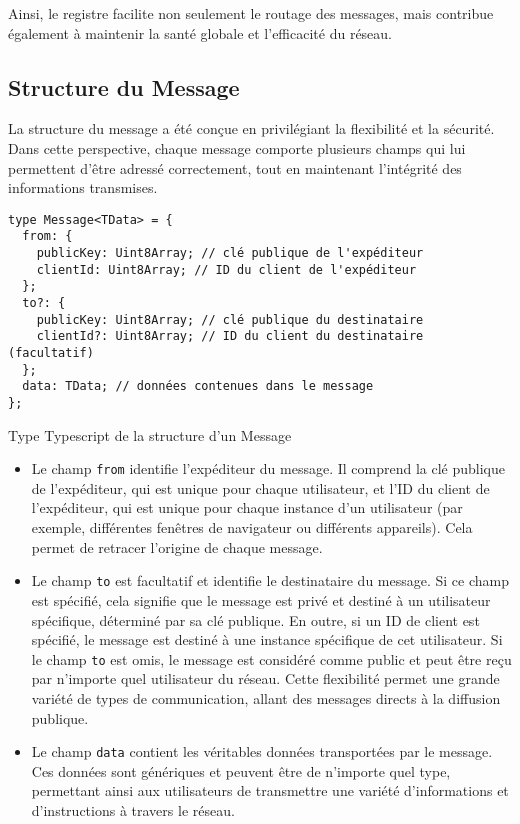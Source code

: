 Ainsi, le registre facilite non seulement le routage des messages, mais contribue également à maintenir la santé globale et l'efficacité du réseau.

\subsection{Structure du Message}

La structure du message a été conçue en privilégiant la flexibilité et la sécurité. Dans cette perspective, chaque message comporte plusieurs champs qui lui permettent d'être adressé correctement, tout en maintenant l'intégrité des informations transmises.

\begin{listing}[H]
    \begin{verbatim}
type Message<TData> = {
  from: {
    publicKey: Uint8Array; // clé publique de l'expéditeur
    clientId: Uint8Array; // ID du client de l'expéditeur
  };
  to?: {
    publicKey: Uint8Array; // clé publique du destinataire
    clientId?: Uint8Array; // ID du client du destinataire (facultatif)
  };
  data: TData; // données contenues dans le message
};
\end{verbatim}
    \caption{Type Typescript de la structure d'un Message}
\end{listing}

\begin{itemize}
    \item Le champ \texttt{from} identifie l'expéditeur du message. Il comprend la clé publique de l'expéditeur, qui est unique pour chaque utilisateur, et l'ID du client de l'expéditeur, qui est unique pour chaque instance d'un utilisateur (par exemple, différentes fenêtres de navigateur ou différents appareils). Cela permet de retracer l'origine de chaque message.
    \item Le champ \texttt{to} est facultatif et identifie le destinataire du message. Si ce champ est spécifié, cela signifie que le message est privé et destiné à un utilisateur spécifique, déterminé par sa clé publique. En outre, si un ID de client est spécifié, le message est destiné à une instance spécifique de cet utilisateur. Si le champ \texttt{to} est omis, le message est considéré comme public et peut être reçu par n'importe quel utilisateur du réseau. Cette flexibilité permet une grande variété de types de communication, allant des messages directs à la diffusion publique.
    \item Le champ \texttt{data} contient les véritables données transportées par le message. Ces données sont génériques et peuvent être de n'importe quel type, permettant ainsi aux utilisateurs de transmettre une variété d'informations et d'instructions à travers le réseau.
\end{itemize}

